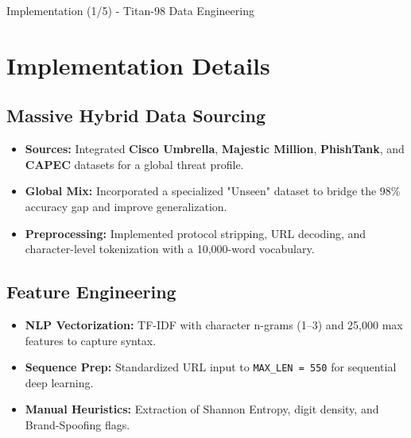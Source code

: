 \documentclass[aspectratio=169,xcolor=dvipsnames]{beamer}
\begin{document}
\begin{frame}{Implementation (1/5) - Titan-98 Data Engineering}
\section{Implementation Details}
\subsection{Massive Hybrid Data Sourcing}
\begin{itemize}
    \item \textbf{Sources:} Integrated \textbf{Cisco Umbrella}, \textbf{Majestic Million}, \textbf{PhishTank}, and \textbf{CAPEC} datasets for a global threat profile.
    \item \textbf{Global Mix:} Incorporated a specialized "Unseen" dataset to bridge the 98\% accuracy gap and improve generalization.
    \item \textbf{Preprocessing:} Implemented protocol stripping, URL decoding, and character-level tokenization with a 10,000-word vocabulary.
\end{itemize}

\subsection{Feature Engineering}
\begin{itemize}
    \item \textbf{NLP Vectorization:} TF-IDF with character n-grams (1--3) and 25,000 max features to capture syntax.
    \item \textbf{Sequence Prep:} Standardized URL input to \texttt{MAX\_LEN = 550} for sequential deep learning.
    \item \textbf{Manual Heuristics:} Extraction of Shannon Entropy, digit density, and Brand-Spoofing flags.
\end{itemize}
\end{frame}
\end{document}
